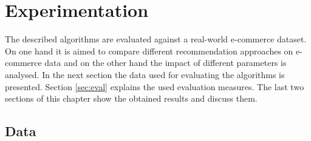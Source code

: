 \documentclass[10pt]{reportMaster}
\begin{document}
\chapter{Experimentation}
\label{chap:experimentation}
The described algorithms are evaluated against a real-world e-commerce dataset.
On one hand it is aimed to compare different recommendation approaches on e-commerce data and on the other hand the impact of different parameters is analysed.
In the next section the data used for evaluating the algorithms is presented.
Section \ref{sec:eval} explains the used evaluation measures.
The last two sections of this chapter show the obtained results and discuss them.

\section{Data}
\label{sec:data}
\end{document}
